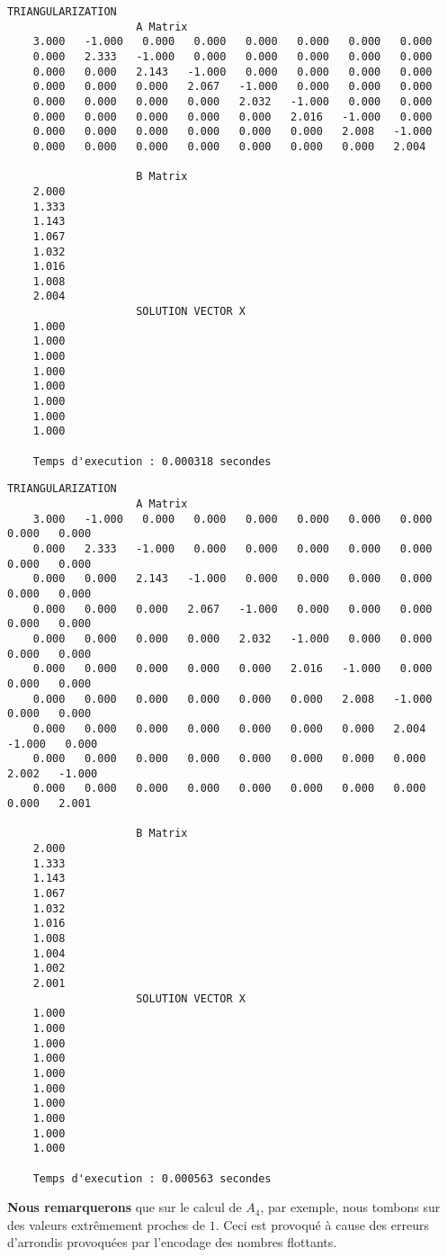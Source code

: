 \newpage
\begin{lstlisting}[caption={$A_{11}X=B$} results, basicstyle=\fontsize{5}{8}\selectfont]
					TRIANGULARIZATION 
					A Matrix 
	3.000   -1.000   0.000   0.000   0.000   0.000   0.000   0.000   
	0.000   2.333   -1.000   0.000   0.000   0.000   0.000   0.000   
	0.000   0.000   2.143   -1.000   0.000   0.000   0.000   0.000   
	0.000   0.000   0.000   2.067   -1.000   0.000   0.000   0.000   
	0.000   0.000   0.000   0.000   2.032   -1.000   0.000   0.000   
	0.000   0.000   0.000   0.000   0.000   2.016   -1.000   0.000   
	0.000   0.000   0.000   0.000   0.000   0.000   2.008   -1.000   
	0.000   0.000   0.000   0.000   0.000   0.000   0.000   2.004   
	
					B Matrix 
	2.000   
	1.333   
	1.143   
	1.067   
	1.032   
	1.016   
	1.008   
	2.004   
					SOLUTION VECTOR X 
	1.000   
	1.000   
	1.000   
	1.000   
	1.000   
	1.000   
	1.000   
	1.000   
	
	Temps d'execution : 0.000318 secondes
\end{lstlisting}
\begin{lstlisting}[caption={$A_{12}=B$} results, basicstyle=\fontsize{5}{8}\selectfont]
					TRIANGULARIZATION 
					A Matrix 
	3.000   -1.000   0.000   0.000   0.000   0.000   0.000   0.000   0.000   0.000   
	0.000   2.333   -1.000   0.000   0.000   0.000   0.000   0.000   0.000   0.000   
	0.000   0.000   2.143   -1.000   0.000   0.000   0.000   0.000   0.000   0.000   
	0.000   0.000   0.000   2.067   -1.000   0.000   0.000   0.000   0.000   0.000   
	0.000   0.000   0.000   0.000   2.032   -1.000   0.000   0.000   0.000   0.000   
	0.000   0.000   0.000   0.000   0.000   2.016   -1.000   0.000   0.000   0.000   
	0.000   0.000   0.000   0.000   0.000   0.000   2.008   -1.000   0.000   0.000   
	0.000   0.000   0.000   0.000   0.000   0.000   0.000   2.004   -1.000   0.000   
	0.000   0.000   0.000   0.000   0.000   0.000   0.000   0.000   2.002   -1.000   
	0.000   0.000   0.000   0.000   0.000   0.000   0.000   0.000   0.000   2.001   
	
					B Matrix 
	2.000   
	1.333   
	1.143   
	1.067   
	1.032   
	1.016   
	1.008   
	1.004   
	1.002   
	2.001   
					SOLUTION VECTOR X 
	1.000   
	1.000   
	1.000   
	1.000   
	1.000   
	1.000   
	1.000   
	1.000   
	1.000   
	1.000   
	
	Temps d'execution : 0.000563 secondes
\end{lstlisting}

\textbf{Nous remarquerons} que sur le calcul de $A_4$, par exemple, nous tombons sur des valeurs extrêmement proches de $1$. Ceci est provoqué à cause des erreurs d'arrondis provoquées par l'encodage des nombres flottants.     